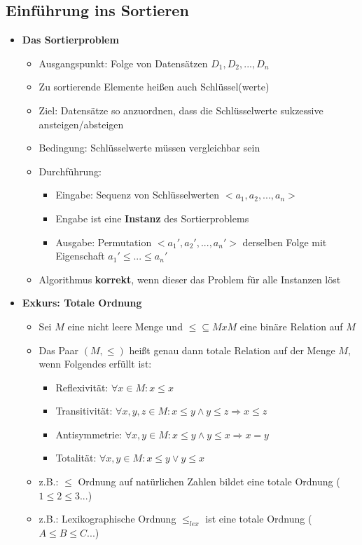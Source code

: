 \subsection{Einführung ins Sortieren}
    \begin{itemize}
        \item \textbf{Das Sortierproblem}
            \begin{itemize}
                \item Ausgangspunkt: Folge von Datensätzen $D_1,D_2,...,D_n$
                \item Zu sortierende Elemente hei\ss en auch Schlüssel(werte)
                \item Ziel: Datensätze so anzuordnen, dass die Schlüsselwerte sukzessive ansteigen/absteigen
                \item Bedingung: Schlüsselwerte müssen vergleichbar sein
                \item Durchführung:
                    \begin{itemize}
                        \item Eingabe: Sequenz von Schlüsselwerten $<a_1,a_2,...,a_n>$
                        \item Engabe ist eine \textbf{Instanz} des Sortierproblems
                        \item Ausgabe: Permutation $<a_1', a_2', ..., a_n'>$ derselben Folge mit Eigenschaft $a_1' \leq ... \leq a_n'$
                    \end{itemize}
                \item Algorithmus \textbf{korrekt}, wenn dieser das Problem für alle Instanzen löst
            \end{itemize}

        \item \textbf{Exkurs: Totale Ordnung}
            \begin{itemize}
                \item Sei $M$ eine nicht leere Menge und $\leq \subseteq MxM$ eine binäre Relation auf $M$
                \item Das Paar $(M, \leq)$ hei\ss t genau dann totale Relation auf der Menge $M$, wenn Folgendes erfüllt ist:
                    \begin{itemize}
                        \item Reflexivität: $\forall x \in M: x \leq x$
                        \item Transitivität: $\forall x,y,z \in M: x \leq y \land y \leq z \Rightarrow x \leq z$
                        \item Antisymmetrie: $\forall x,y \in M: x \leq y \land y \leq x \Rightarrow x = y$
                        \item Totalität: $\forall x,y \in M: x \leq y \lor y \leq x$
                    \end{itemize}
                \item z.B.: $\leq$ Ordnung auf natürlichen Zahlen bildet eine totale Ordnung ($1 \leq 2 \leq 3 ...$)
                \item z.B.: Lexikographische Ordnung $\leq_{lex}$ ist eine totale Ordnung ($A \leq B \leq C ...$)
            \end{itemize}
        

\end{itemize}
